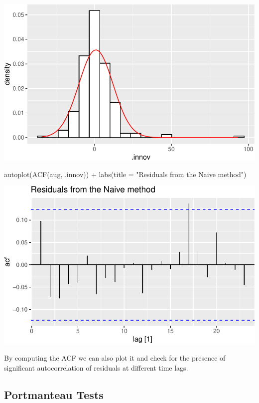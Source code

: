 \documentclass[
  letterpaper,
  DIV=11,
  numbers=noendperiod]{scrartcl}
\newenvironment{Shaded}{\begin{snugshade}}{\end{snugshade}}
\newcommand{\AttributeTok}[1]{\textcolor[rgb]{0.40,0.45,0.13}{#1}}
\newcommand{\FunctionTok}[1]{\textcolor[rgb]{0.28,0.35,0.67}{#1}}
\newcommand{\NormalTok}[1]{\textcolor[rgb]{0.00,0.23,0.31}{#1}}
\newcommand{\SpecialCharTok}[1]{\textcolor[rgb]{0.37,0.37,0.37}{#1}}
\newcommand{\StringTok}[1]{\textcolor[rgb]{0.13,0.47,0.30}{#1}}
\begin{document}
\begin{center}
\includegraphics{chapter5_review_files/figure-pdf/unnamed-chunk-30-1.pdf}
\end{center}

\begin{Shaded}
\begin{Highlighting}[]
\FunctionTok{autoplot}\NormalTok{(}\FunctionTok{ACF}\NormalTok{(aug, .innov)) }\SpecialCharTok{+}
  \FunctionTok{labs}\NormalTok{(}\AttributeTok{title =} \StringTok{"Residuals from the Naive method"}\NormalTok{)}
\end{Highlighting}
\end{Shaded}

\begin{center}
\includegraphics{chapter5_review_files/figure-pdf/unnamed-chunk-31-1.pdf}
\end{center}

By computing the ACF we can also plot it and check for the presence of
significant autocorrelation of residuals at different time lags.

\subsection{Portmanteau Tests}\label{portmanteau-tests}
\end{document}

